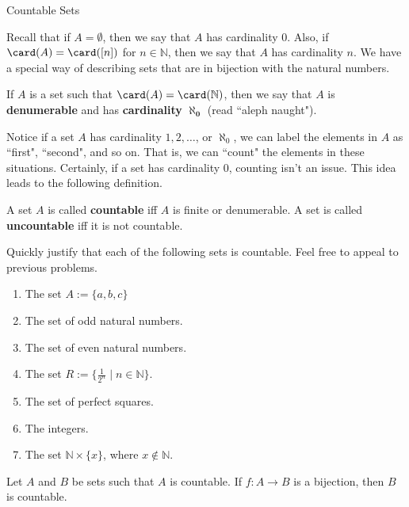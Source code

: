 \begin{section}{Countable Sets}

Recall that if $A=\emptyset$, then we say that $A$ has cardinality 0.  Also, if $\card(A)=\card([n])$ for $n\in\mathbb{N}$, then we say that $A$ has cardinality $n$.  We have a special way of describing sets that are in bijection with the natural numbers.

\begin{definition}
If $A$ is a set such that $\card(A)=\card(\mathbb{N})$, then we say that $A$ is \textbf{denumerable} and has \textbf{cardinality} $\mathbf{\aleph_0}$ (read ``aleph naught").
\end{definition}

Notice if a set $A$ has cardinality $1,2,\ldots$, or $\aleph_0$, we can label the elements in $A$ as ``first", ``second", and so on.  That is, we can ``count" the elements in these situations. Certainly, if a set has cardinality 0, counting isn't an issue.  This idea leads to the following definition.

\begin{definition}\label{def:countable}
A set $A$ is called \textbf{countable} iff $A$ is finite or denumerable. A set is called \textbf{uncountable} iff it is not countable.
\end{definition}

\begin{exercise}
Quickly justify that each of the following sets is countable. Feel free to appeal to previous problems.
\begin{enumerate}[label=\textrm{(\alph*)}]
\item The set $A:=\{a,b,c\}$
\item The set of odd natural numbers.
\item The set of even natural numbers.
\item The set $R:=\{\frac{1}{2^n}\mid n\in \mathbb{N}\}$.
\item The set of perfect squares.
\item The integers.
\item The set $\mathbb{N}\times \{x\}$, where $x\notin \mathbb{N}$.
\end{enumerate}
\end{exercise}

\begin{theorem}
Let $A$ and $B$ be sets such that $A$ is countable. If $f:A\to B$ is a bijection, then $B$ is countable.
\end{theorem}


\end{section}
